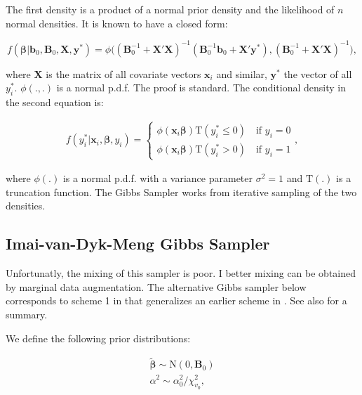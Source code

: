 \documentclass[11pt,a4paper]{article}
\newcommand{\f}{\mathit{f}}
\begin{document}
The first density is a product of a normal prior density and the likelihood of $n$ normal densities. It is known to have a closed form:

\begin{equation}
	\f(\boldsymbol{\beta} | \mathbf{b}_0, \mathbf{B}_0, \mathbf{X}, \mathbf{y}^{*}) = 
		\phi \big (  (\mathbf{B}_0^{-1} + \mathbf{X}'\mathbf{X})^{-1} (\mathbf{B}_0^{-1} \mathbf{b}_0 + \mathbf{X}'\mathbf{y}^{*}), (\mathbf{B}_0^{-1} + \mathbf{X}'\mathbf{X})^{-1} \big ),
\end{equation} 

where $\mathbf{X}$ is the matrix of all covariate vectors $\mathbf{x}_i$ and similar, $\mathbf{y}^{*}$ the vector of all $y_i^{*}$. $\phi(.,.)$ is a normal p.d.f. The proof is standard. The conditional density in the second equation is: 

\begin{equation}
\begin{split}
	  \f(y_{i}^{*} | \mathbf{x}_i, \boldsymbol{\beta}, y_i)  = \left \{
	  \begin{array}{ll}
	    	\phi(\mathbf{x}_i \boldsymbol{\beta})\mathrm{T}(y_i^* \leq 0) \quad \text{if \ } y_i = 0 \\
	    	\phi(\mathbf{x}_i \boldsymbol{\beta})\mathrm{T}(y_i^* > 0) \quad \text{if \ } y_i = 1
	  \end{array} \right.,
\end{split}	
\end{equation}

where $\phi(.)$ is a normal p.d.f. with a variance parameter $\sigma^2=1$ and $\mathrm{T}(.)$ is a truncation function. The Gibbs Sampler works from iterative sampling of the two densities. 

\subsection*{Imai-van-Dyk-Meng Gibbs Sampler}

Unfortunatly, the mixing of this sampler is poor. I better mixing can be obtained by marginal data augmentation.
The alternative Gibbs sampler below corresponds to scheme 1 in \citet[p. 317-318]{Imai.vanDyk.2005} that generalizes an earlier scheme in \citet{vanDyk.Meng.2001}. See also \citet[390]{Jackman.2009} for a summary. 

We define the following prior distributions: 

\begin{equation}
	\begin{split}
	\bm{\tilde{\beta}} \sim \mathrm{N}(0,\mathbf{B}_0) \\
	\alpha^2 \sim \alpha_0^2/\chi_{v_0}^2, 
	\end{split}
\end{equation}
\end{document}
